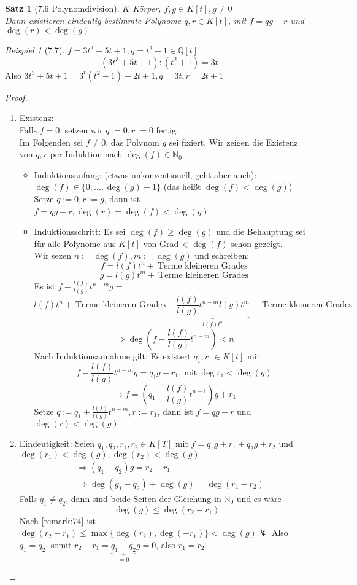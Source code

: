 \documentclass[a4paper]{scrartcl}
\theoremstyle{definition}
\theoremstyle{plain}
\newtheorem{thm}{Satz}
\theoremstyle{plain}
\theoremstyle{remark}
\theoremstyle{remark}
\theoremstyle{remark}
\newtheorem{ex}{Beispiel}
\begin{document}
\begin{thm}[7.6 Polynomdivision]
\label{thm:poly_div}
$K$ Körper, $f,g\in K[t], g\neq 0$ \\
  Dann existieren eindeutig bestimmte Polynome $q,r \in K[t]$, mit $f = q g + r$ und $\deg(r) < \deg(g)$
\end{thm}

\begin{ex}[7.7]
$f = 3 t^3 + 5 t + 1, g = t^2 + 1 \in\mathbb{Q}[t]$
\[(3 t^3 + 5 t + 1) : (t ^2 + 1) = 3 t\]
Also $3 t^3 + 5t + 1 = 3^t (t^2 + 1) + 2 t + 1, q = 3 t, r = 2 t + 1$
\end{ex}

\begin{proof}
\begin{enumerate}
\item Existenz: \\
     Falls $f = 0$, setzen wir $q := 0, r:= 0$ fertig. \\
     Im Folgenden sei $f\neq 0$, das Polynom $g$ sei fixiert. Wir zeigen die Existenz von $q,r$ per Induktion nach $\deg(f) \in\mathbb{N}_0$ \\
\begin{itemize}
\item Induktionsanfang: (etwas unkonventionell, geht aber auch): $\deg(f) \in \{0,\ldots,\deg(g) - 1\}$ (das heißt $\deg(f) < \deg(g)$) \\
       Setze $q:= 0, r:= g$, dann ist $f = q g + r, \deg(r) = \deg(f) < \deg(g)$.
\item Induktionsschritt: Es sei $\deg(f) \geq \deg(g)$ und die Behauptung sei für alle Polynome aus $K[t]$ von Grad < $\deg(f)$ schon gezeigt. \\
       Wir sezen $n:= \deg(f), m:=\deg(g)$ und schreiben:
\[f = l(f)t^n + ~\text{Terme kleineren Grades}\]
\[g = l(g) t^m + ~\text{Terme kleineren Grades}\]
Es ist $f - \frac{l(f)}{l(g)}t^{n - m}g =$
\[l(f) t^n + ~\text{Terme kleineren Grades} - \underbrace{\frac{l(f)}{l(g)} t^{n - m}l(g) t^m}_{l(f)t^n} + ~\text{Terme kleineren Grades}\]
\[\Rightarrow \deg(f - \frac{l(f)}{l(g)}t^{n - m}) < n\]
Nach Induktionsannahme gilt: Es existert $q_1,r_1 \in K[t]$ mit
\[f - \frac{l(f)}{l(g)}t^{n -m}g = q_1 g + r_1, ~\text{mit}~\deg{r_1} < \deg(g)\]
\[\rightarrow f = (q_1 + \frac{l(f)}{l(g)} t^{n - 1})g + r_1\]
Setze $q:= q_1 + \frac{l(f)}{l(g)}t^{n - m}, r:= r_1$, dann ist $f = q g + r$ und $\deg(r) < \deg(g)$
\end{itemize}
\item Eindeutigkeit: Seien $q_1,q_2,r_1,r_2\in K[T]$ mit $f = q_1 g + r_1 + q_2 g + r_2$ und $\deg(r_1) < \deg(g), \deg(r_2) < \deg(g)$
\begin{align*}
&\Rightarrow (q_1 - q_2) g = r_2 - r_1 \\
&\Rightarrow \deg(g_1 - q_2) + \deg(g) = \deg(r_1 - r_2)
\end{align*}
Falls $q_1 \neq q_2$, dann sind beide Seiten der Gleichung in $\mathbb{N}_0$ und es wäre
\[\deg(g) \leq \deg(r_2 - r_1)\]
Nach \ref{remark:74} ist $\deg(r_2 - r_1) \leq \max\{\deg(r_2),\deg(-r_1)\} < \deg(g) \lightning$
Also $q_1 = q_2$, somit $r_2 - r_1 = \underbrace{q_1 - q_2}_{= 0} g = 0$, also $r_1 = r_2$
\end{enumerate}
\end{proof}
\end{document}
